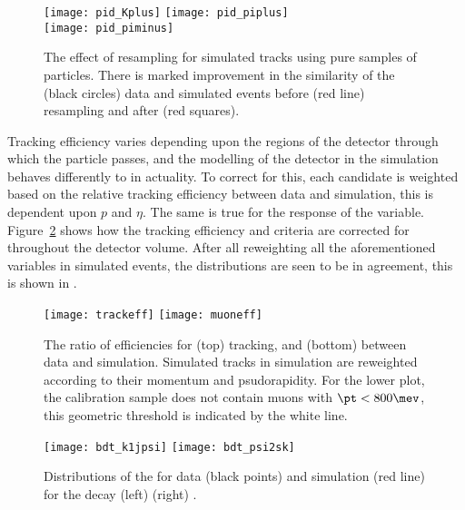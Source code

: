 \begin{figure}[t]
  \begin{center}
    \texttt{[image: pid\_Kplus]}
    \texttt{[image: pid\_piplus]}\\
    \texttt{[image: pid\_piminus]}
    \caption[Effect of resampling PID variables in simulation]
    {
      The effect of \pid resampling for simulated tracks using pure samples of particles.
      There is marked improvement in the similarity of the (black circles) \btojpsikpipi data and
      simulated events before (red line) resampling and after (red squares).
    }
    \label{fig:hhh:pid}
  \end{center}
\end{figure}


Tracking efficiency varies depending upon the regions of the detector through which the particle
passes, and the modelling of the detector in the simulation behaves differently to in actuality.
To correct for this, each candidate is weighted based on the relative tracking efficiency between
data and simulation, this is dependent upon $p$ and $\eta$.
The same is true for the response of the \ismuon variable.
Figure~\ref{fig:hhh:trackeff} shows how the tracking efficiency and \ismuon criteria are corrected
for throughout the detector volume.
After all reweighting all the aforementioned variables in simulated events, the \BDT distributions
are seen to be in agreement, this is shown in .

\begin{figure}[t]
  \begin{center}
    \texttt{[image: trackeff]}
    \texttt{[image: muoneff]}
  \end{center}
  \caption[Corrections for {\tt isMuon} and tracking efficiency in simulation]
  {
    The ratio of efficiencies for (top) tracking, and (bottom) \ismuon between data and simulation.
    Simulated tracks in simulation are reweighted according to their momentum and psudorapidity.
    For the lower plot, the calibration sample does not contain muons with $\pt<800\mev$, this
    geometric threshold is indicated by the white line.
  }
  \label{fig:hhh:trackeff}
\end{figure}

\begin{figure}[t]
  \begin{center}
    \texttt{[image: bdt\_k1jpsi]}
    \texttt{[image: bdt\_psi2sk]}
    \caption[Distributions of BDT response in data and simulation]
    {
      Distributions of the \BDT for data (black points) and simulation (red line) for the decay
      (left) 
      (right) \btopsitwosk.
    }
    \label{fig:kpipi:bdt}
  \end{center}
\end{figure}

